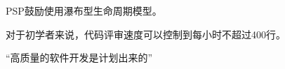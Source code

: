 \begin{problem}
	PSP鼓励使用瀑布型生命周期模型。
\end{problem}



\begin{problem}
	对于初学者来说，代码评审速度可以控制到每小时不超过400行。
\end{problem}



\begin{problem}
    ‍“高质量的软件开发是计划出来的”
\end{problem}

